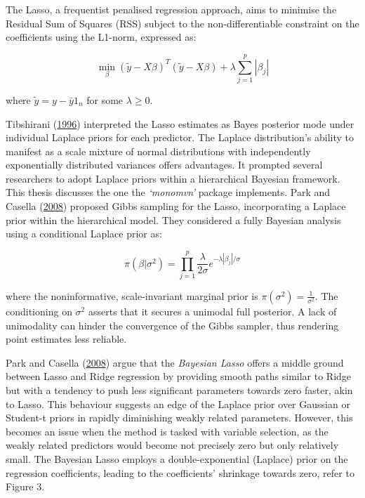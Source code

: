 \documentclass[
  11pt,
]{article}
\begin{document}
The Lasso, a frequentist penalised regression approach, aims to minimise
the Residual Sum of Squares (RSS) subject to the non-differentiable
constraint on the coefficients using the L1-norm, expressed as:

\begin{equation}
\min_{\beta} \left(\tilde{y} - X\beta \right)^T \left(\tilde{y} - X\beta \right) + \lambda \sum_{j=1}^{p} |\beta_j|
\end{equation}

where \(\tilde{y} = y - \bar{y}1_n\) for some \(\lambda \geq 0\).

Tibshirani (\protect\hyperlink{ref-Tibshirani1996}{1996}) interpreted
the Lasso estimates as Bayes posterior mode under individual Laplace
priors for each predictor. The Laplace distribution's ability to
manifest as a scale mixture of normal distributions with independently
exponentially distributed variances offers advantages. It prompted
several researchers to adopt Laplace priors within a hierarchical
Bayesian framework. This thesis discusses the one the \emph{`monomvn'}
package implements. Park and Casella
(\protect\hyperlink{ref-Casella2008}{2008}) proposed Gibbs sampling for
the Lasso, incorporating a Laplace prior within the hierarchical model.
They considered a fully Bayesian analysis using a conditional Laplace
prior as:

\begin{equation}
\pi(\beta|\sigma^2) = \prod_{j=1}^{p} \frac{\lambda}{2\sigma} e^{-\lambda|\beta_j|/\sigma}
\end{equation}

where the noninformative, scale-invariant marginal prior is
\(\pi(\sigma^2) = \frac{1}{\sigma^2}\). The conditioning on \(\sigma^2\)
asserts that it secures a unimodal full posterior. A lack of unimodality
can hinder the convergence of the Gibbs sampler, thus rendering point
estimates less reliable.

Park and Casella (\protect\hyperlink{ref-Casella2008}{2008}) argue that
the \emph{Bayesian Lasso} offers a middle ground between Lasso and Ridge
regression by providing smooth paths similar to Ridge but with a
tendency to push less significant parameters towards zero faster, akin
to Lasso. This behaviour suggests an edge of the Laplace prior over
Gaussian or Student-t priors in rapidly diminishing weakly related
parameters. However, this becomes an issue when the method is tasked
with variable selection, as the weakly related predictors would become
not precisely zero but only relatively small. The Bayesian Lasso employs
a double-exponential (Laplace) prior on the regression coefficients,
leading to the coefficients' shrinkage towards zero, refer to Figure 3.
\end{document}
